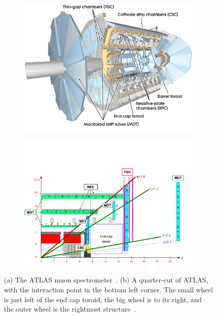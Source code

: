 \begin{figure}
\centering
\begin{subfigure}{.5\textwidth}
  \centering
  \includegraphics[width=\linewidth]{figures/atlas_muon_spectrometer.jpg}
  \caption{}
  \label{fig:atlas_muon_spectrometer_3D}
\end{subfigure}%
\begin{subfigure}{.5\textwidth}
  \centering
  \includegraphics[width=\linewidth]{figures/atlas_old_muon_spec_quarter_cut_recolour.png}
  \caption{}
  \label{fig:atlas_muon_spectrometer_cut}
\end{subfigure}
\caption{(a) The ATLAS muon spectrometer~\cite{collaboration_atlas_2008}. (b) A quarter-cut of ATLAS, with the interaction point in the bottom left corner. The small wheel is just left of the end cap toroid, the big wheel is to its right, and the outer wheel is the rightmost structure~\cite{atlas_performance_muon_trigger_2015}.}
\label{fig:atlas_muon_spectrometer}
\end{figure}

